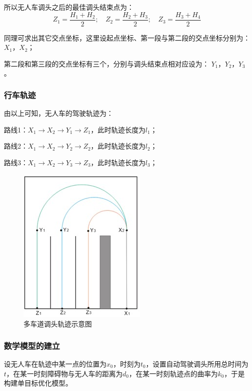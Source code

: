 \documentclass{article}
\begin{document}
\noindent 所以无人车调头之后的最佳调头结束点为：
\begin{equation*}
    Z_{1}=\frac{H_{1}+H_{2}}{2} ; \quad Z_{2}=\frac{H_{2}+H_{3}}{2} ; \quad Z_{3}=\frac{H_{3}+H_{4}}{2}
\end{equation*}

\noindent 同理可求出其它交点坐标，这里设起点坐标、第一段与第二段的交点坐标分别为：$X_1，X_2$；

\noindent 第二段和第三段的交点坐标有三个，分别与调头结束点相对应设为：
$Y_1，Y_2，Y_3$。

\subsubsection{行车轨迹}
\noindent 由以上可知，无人车的驾驶轨迹为：

\noindent 路线1：$X_1\rightarrow X_2\rightarrow Y_1\rightarrow Z_1$，此时轨迹长度为$l_1$；

\noindent 路线2：$X_1\rightarrow X_2\rightarrow Y_2\rightarrow Z_2$，此时轨迹长度为$l_2$；

\noindent 路线3：$X_1\rightarrow X_2\rightarrow Y_3\rightarrow Z_3$，此时轨迹长度为$l_3$；
\begin{figure}[H]
    \centering
    \includegraphics[scale=0.9]{7.jpg}
    \caption{多车道调头轨迹示意图}
\end{figure}

\subsubsection{数学模型的建立}
设无人车在轨迹中某一点的位置为$x_0$，时刻为$t_0$，设置自动驾驶调头所用总时间为$t$，在某一时刻障碍物与无人车的距离为$d_0$，在某一时刻轨迹点的曲率为$k_0$，于是构建单目标优化模型\cite{余卓平2017无人车运动规划算法综述}。
\end{document}
